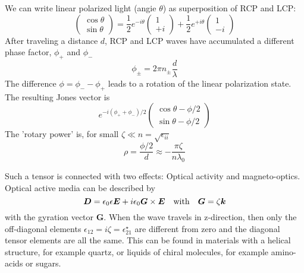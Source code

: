 We can write linear polarized light (angie $\theta$) as  superposition of RCP and LCP:
\begin{equation}
    \begin{pmatrix}
        \cos \theta \\ \sin \theta
    \end{pmatrix}
    = 
    \frac{1}{2} e^{-i \theta} 
    \begin{pmatrix}
        1 \\ +i 
    \end{pmatrix}
    +
    \frac{1}{2} e^{+i \theta} 
    \begin{pmatrix}
        1 \\ -i 
    \end{pmatrix}
\end{equation}
After traveling a distance $d$, RCP and LCP waves have accumulated a different phase factor, $\phi_+$ and $\phi_-$
\begin{equation}
    \phi_\pm = 2 \pi n_\pm \frac{d}{\lambda}
\end{equation}
The difference $\phi =\phi_- - \phi_+$ leads to a rotation of the linear polarization state. The resulting Jones vector is
\begin{equation}
    e^{-i (\phi_+ + \phi_-) / 2} 
    \begin{pmatrix}
        \cos \theta  - \phi/2\\ \sin \theta - \phi/2
    \end{pmatrix}
\end{equation}
The 'rotary power' is, for small $\zeta \ll n = \sqrt{\epsilon_{ii}}$
\begin{equation}
    \rho = \frac{\phi/2}{d} \approx - \frac{\pi \zeta}{n \lambda_0}
\end{equation}

Such a tensor is connected with two effects: Optical activity and magneto-optics. Optical active media can be described by 
\begin{equation}
    \boldsymbol{D} = \epsilon_0 \epsilon \boldsymbol{E} + i \epsilon_0 \boldsymbol{G} \times \boldsymbol{E} \quad \text{with} \quad \boldsymbol{G} = \zeta \boldsymbol{k}
\end{equation}
with the gyration vector $\boldsymbol{G}$. When the wave travels in z-direction, then only the off-diagonal elements $\epsilon_{12} = i \zeta = \epsilon_{21}^\star$ are different from zero and the diagonal tensor elements are all the same. This can be found in materials with a helical structure, for example quartz, or liquids of chiral molecules, for example amino-acids or sugars.


